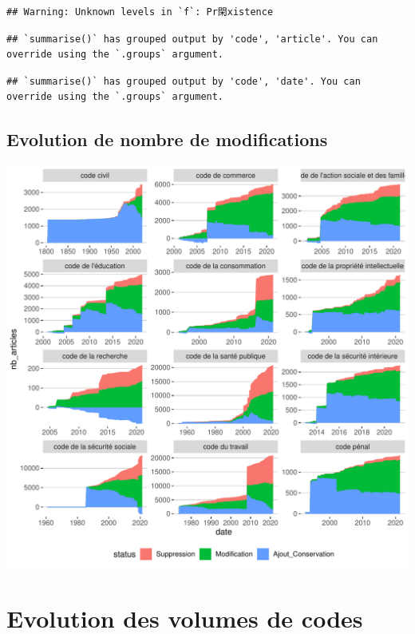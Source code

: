 \documentclass[
  oneside]{book}
\begin{document}
\begin{verbatim}
## Warning: Unknown levels in `f`: Pr閑xistence
\end{verbatim}

\begin{verbatim}
## `summarise()` has grouped output by 'code', 'article'. You can override using the `.groups` argument.
\end{verbatim}

\begin{verbatim}
## `summarise()` has grouped output by 'code', 'date'. You can override using the `.groups` argument.
\end{verbatim}

\hypertarget{evolution-de-nombre-de-modifications}{%
\subsection{Evolution de nombre de modifications}\label{evolution-de-nombre-de-modifications}}

\includegraphics{05-images_files/figure-latex/modif.evol.plot-1.pdf}

\hypertarget{evolution-des-volumes-de-codes}{%
\section{Evolution des volumes de codes}\label{evolution-des-volumes-de-codes}}
\end{document}
